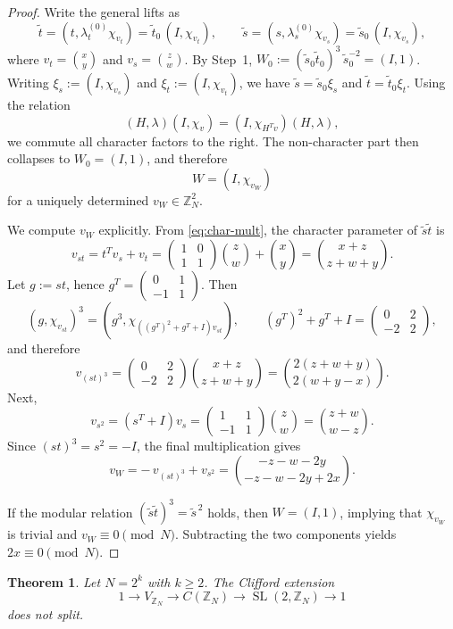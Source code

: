 \documentclass[11pt, reqno]{amsart}
\newtheorem{theorem}{Theorem}[section]
\theoremstyle{definition}
\theoremstyle{remark}
\newcommand{\Z}{\mathbb{Z}}
\DeclareMathOperator{\SL}{SL}
\begin{document}
\begin{proof}
Write the general lifts as
\[
\tilde t=(t,\lambda_t^{(0)}\chi_{v_t})=\tilde t_0\,(I,\chi_{v_t}),\qquad
\tilde s=(s,\lambda_s^{(0)}\chi_{v_s})=\tilde s_0\,(I,\chi_{v_s}),
\]
where $v_t=\binom{x}{y}$ and $v_s=\binom{z}{w}$.
By Step~1, $W_0:=(\tilde s_0\tilde t_0)^3\,\tilde s_0^{-2}=(I,1)$.
Writing $\xi_s:=(I,\chi_{v_s})$ and $\xi_t:=(I,\chi_{v_t})$, we have $\tilde s=\tilde s_0\xi_s$ and $\tilde t=\tilde t_0\xi_t$. Using the relation
\[
(H,\lambda)(I,\chi_v)=(I,\chi_{H^Tv})(H,\lambda),
\]
we commute all character factors to the right. The non-character part then collapses to $W_0=(I,1)$, and therefore
\[
W=(I,\chi_{v_W})
\]
for a uniquely determined $v_W\in\Z_N^2$.

We compute $v_W$ explicitly. From \eqref{eq:char-mult}, the character parameter of $\tilde s\tilde t$ is
\[
v_{st}=t^Tv_s+v_t
=\begin{pmatrix}1&0\\1&1\end{pmatrix}\binom{z}{w}+\binom{x}{y}
=\binom{x+z}{z+w+y}.
\]
Let $g:=st$, hence $g^T=\begin{pmatrix}0&1\\-1&1\end{pmatrix}$. Then
\[
(g,\chi_{v_{st}})^3=(g^3,\chi_{((g^T)^2+g^T+I)v_{st}}),
\qquad
(g^T)^2+g^T+I=\begin{pmatrix}0&2\\-2&2\end{pmatrix},
\]
and therefore
\[
v_{(st)^3}
=\begin{pmatrix}0&2\\-2&2\end{pmatrix}\binom{x+z}{z+w+y}
=\binom{2(z+w+y)}{2(w+y-x)}.
\]
Next,
\[
v_{s^2}=(s^T+I)v_s
=\begin{pmatrix}1&1\\-1&1\end{pmatrix}\binom{z}{w}
=\binom{z+w}{w-z}.
\]
Since $(st)^3=s^2=-I$, the final multiplication gives
\[
v_W=-\,v_{(st)^3}+v_{s^2}
=\binom{-z-w-2y}{-z-w-2y+2x}.
\]

If the modular relation $(\tilde s\tilde t)^3=\tilde s^{\,2}$ holds, then $W=(I,1)$, implying that $\chi_{v_W}$ is trivial and $v_W\equiv 0\pmod N$. Subtracting the two components yields $2x\equiv 0\pmod N$.
\end{proof}

\begin{theorem}\label{thm:nonsplit-cyclic}
Let $N=2^k$ with $k\ge 2$. The Clifford extension
\[
1\longrightarrow V_{\Z_N}\longrightarrow C(\Z_N)\longrightarrow \SL(2,\Z_N)\longrightarrow 1
\]
does not split.
\end{theorem}
\end{document}
